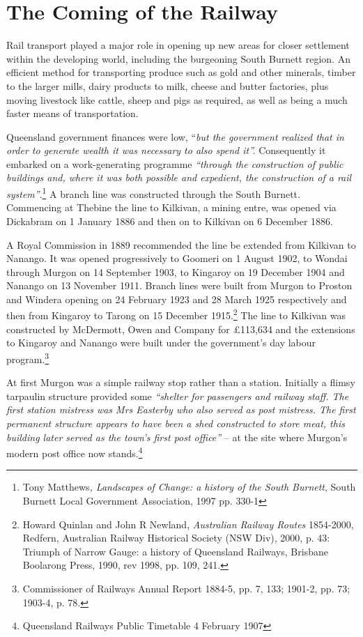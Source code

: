 \section{The Coming of the Railway}



Rail transport played a major role in opening up new areas for closer settlement within the developing world, including the burgeoning South Burnett region. An efficient method for transporting produce such as gold and other minerals, timber to the larger mills, dairy products to milk, cheese and butter factories, plus moving livestock like cattle, sheep and pigs as required, as well as being a much faster means of transportation.



Queensland government finances were low, ``\emph{but the government realized that in order to generate wealth it was necessary to also spend it''.} Consequently it embarked on a work-generating programme \emph{``through the construction of public buildings and, where it was both possible and expedient, the construction of a rail system''}.\footnote{Tony Matthews\emph{, Landscapes of Change: a history of the South Burnett}, South Burnett Local Government Association, 1997 pp. 330-1} A branch line was constructed through the South Burnett. Commencing at Thebine the line to Kilkivan, a mining entre, was opened via Dickabram on 1 January 1886 and then on to Kilkivan on 6 December 1886.


A Royal Commission in 1889 recommended the line be extended from Kilkivan to Nanango. It was opened progressively to Goomeri on 1 August 1902, to Wondai through Murgon on 14 September 1903, to Kingaroy on 19 December 1904 and Nanango on 13 November 1911. Branch lines were built from Murgon to Proston and Windera opening on 24 February 1923 and 28 March 1925 respectively and then from Kingaroy to Tarong on 15 December 1915.\footnote{Howard Quinlan and John R Newland, \emph{Australian Railway Routes} 1854-2000, Redfern, Australian Railway Historical Society (NSW Div), 2000, p. 43: Triumph of Narrow Gauge: a history of Queensland Railways, Brisbane Boolarong Press, 1990, rev 1998, pp. 109, 241.} The line to Kilkivan was constructed by McDermott, Owen and Company for \pounds113,634 and the extensions to Kingaroy and Nanango were built under the government's day labour program.\footnote{Commissioner of Railways Annual Report 1884-5, pp. 7, 133; 1901-2, pp. 73; 1903-4, p. 78.}


At first Murgon was a simple railway stop rather than a station. Initially a flimsy tarpaulin structure provided some \emph{``shelter for passengers and railway staff. The first station mistress was Mrs Easterby who also served as post mistress. The first permanent structure appears to have been a shed constructed to store meat, this building later served as the town's first post office''} -- at the site where Murgon's modern post office now stands.\footnote{Queensland Railways Public Timetable 4 February 1907}


